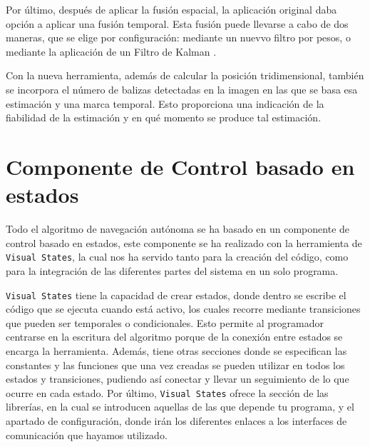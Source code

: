 \hspace{1cm} Por último, después de aplicar la fusión espacial, la aplicación original daba opción a aplicar una fusión temporal. Esta fusión puede llevarse a cabo de dos maneras, que se elige por configuración: mediante un nuevvo filtro por pesos, o mediante la aplicación de un Filtro de Kalman \cite{FiltroKalman}.

\hspace{1cm} Con la nueva herramienta, además de calcular la posición tridimensional, también se incorpora el número de balizas detectadas en la imagen en las que se basa esa estimación y una marca temporal. Esto proporciona una indicación de la fiabilidad de la
estimación y en qué momento se produce tal estimación.

\section{Componente de Control basado en estados}
\hspace{1cm} Todo el algoritmo de navegación autónoma se ha basado en un componente de control basado en estados, este componente se ha realizado con la herramienta de \texttt{Visual States}, la cual nos ha servido tanto para la creación del código, como para la integración de las diferentes partes del sistema en un solo programa. 

\hspace{1cm} \texttt{Visual States} tiene la capacidad de crear estados, donde dentro se escribe el código que se ejecuta cuando está activo, los cuales recorre mediante transiciones que pueden ser temporales o condicionales. Esto permite al programador centrarse en la escritura del algoritmo porque de la conexión entre estados se encarga la herramienta. Además, tiene otras secciones donde se especifican las constantes y las funciones que una vez creadas se pueden utilizar en todos los estados y transiciones, pudiendo así conectar y llevar un seguimiento de lo que ocurre en cada estado. Por último, \texttt{Visual States} ofrece la sección de las librerías, en la cual se introducen aquellas de las que depende tu programa, y el apartado de configuración, donde irán los diferentes enlaces a los interfaces de comunicación que hayamos utilizado. 


